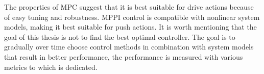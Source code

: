 The properties of \ac{MPC} suggest that it is best suitable for drive actions because of easy tuning and robustness. \Ac{MPPI} control is compatible with nonlinear system models, making it best suitable for push actions. It is worth mentioning that the goal of this thesis is not to find the best optimal controller. The goal is to gradually over time choose control methods in combination with system models that result in better performance, the performance is measured with various metrics to which  is dedicated.\bs
